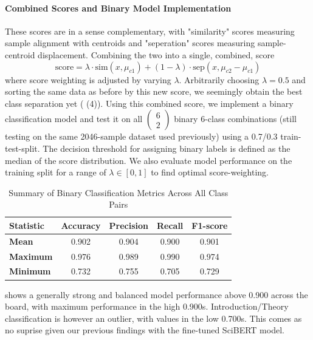 \paragraph{Combined Scores and Binary Model Implementation}

These scores are in a sense complementary, with "similarity" scores measuring sample alignment with centroids and "seperation" scores measuring sample-centroid displacement. Combining the two into a single, combined, score
\begin{equation}
    \text{score} = \lambda \cdot \text{sim}(x, \mu_{c1})+(1-\lambda)\cdot \text{sep}(x, \mu_{c2}-\mu_{c1})
\end{equation}
where score weighting is adjusted by varying $\lambda$. Arbitrarily choosing $\lambda = 0.5$ and sorting the same data as before by this new score, we seemingly obtain the best class separation yet ( (4)). Using this combined score, we implement a binary classification model and test it on all $\begin{pmatrix}
    6\\
    2
\end{pmatrix}$ binary 6-class combinations (still testing on the same 2046-sample dataset used previously) using a 0.7/0.3 train-test-split. The decision threshold for assigning binary labels is defined as the median of the score distribution. We also evaluate model performance on the training split for a range of $\lambda\in[0, 1]$ to find optimal score-weighting.

\begin{table}[ht]
\centering
\caption{Summary of Binary Classification Metrics Across All Class Pairs}
\begin{tabular}{lcccc}
\toprule
\textbf{Statistic} & \textbf{Accuracy} & \textbf{Precision} & \textbf{Recall} & \textbf{F1-score} \\
\midrule
\textbf{Mean}   & 0.902             & 0.904              & 0.900           & 0.901 \\
\textbf{Maximum}   & 0.976             & 0.989              & 0.990           & 0.974 \\
\textbf{Minimum}   & 0.732             & 0.755              & 0.705           & 0.729 \\
\bottomrule
\end{tabular}
\label{tab:105}
\end{table}

\noindent {} shows a generally strong and balanced model performance above 0.900 across the board, with maximum performance in the high 0.900s. Introduction/Theory classification is however an outlier, with values in the low 0.700s. This comes as no suprise given our previous findings with the fine-tuned SciBERT model.


